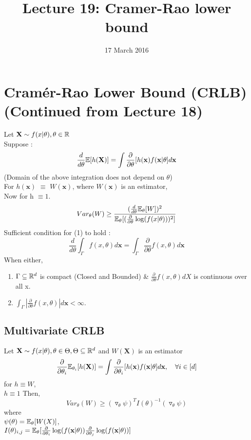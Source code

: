 \documentclass[a4paper,english,12pt]{article}
\title{Lecture 19: Cramer-Rao lower bound}
\date{17 March 2016}
\newcommand{\bx}{\mathbf{x}}
\newcommand{\bX}{\mathbf{X}}
\begin{document}
\author{}
\maketitle
\section{Cram\'{e}r-Rao Lower Bound (CRLB)(Continued from Lecture 18)}
Let $\bX \sim f(x|\theta), \theta \in \R$ \\
Suppose :\\
\begin{equation}
	\frac{d}{d\theta} \E[h(\bX)]=\int \frac{\partial}{\partial\theta} [h(\bx)f(\bx|\theta] d\bx
\end{equation}
(Domain of the above integration does not depend on $\theta$) \\
 For $h(\bx)$ $\equiv$ $W(\bx)$, where   $W(\bx)$  is  an  estimator, \\Now for h $\equiv 1$.\\
 \begin{equation}
 Var_{\theta} (W) \geq \frac{(\frac{d}{d\theta} \mathbb{E}_{\theta}[W])^2}{\mathbb{E}_{\theta}[(\frac{\partial}{\partial\theta} \log (f(x|\theta)))^2]}
 \end{equation}
 Sufficient condition for (1) to hold :
 \begin{equation}
 \frac{d}{d\theta} \int_{\Gamma} f(x,\theta) d\bx = \int_{\Gamma} \frac{\partial}{\partial\theta}  f(x,\theta) d\bx
 \end{equation}
 When either,
 \begin{enumerate}
 	\item $\Gamma \subseteq \mathbb{R}^d $ is compact (Closed and Bounded) \& $\frac{\partial}{\partial\theta}  f(x,\theta) dX$ is continuous over all x. 
 	\item $\int_{\Gamma} |\frac{\partial}{\partial\theta}  f(x,\theta)| d\bx <\infty$.
 \end{enumerate}
\subsection{Multivariate CRLB}
Let $\bX \sim f(x|\theta), \theta \in \Theta, \Theta \subseteq \R^d$ and $W(\bX)$ is an estimator
\begin{equation}
\frac{\partial}{\partial\theta_i} \E_{\theta_i}[h(\bX)]=\int \frac{\partial}{\partial\theta_i} [h(\bx)f(\bx|\theta] d\bx, \quad \forall i \in [d]
\end{equation}
for $h \equiv W$, \\$h \equiv 1$
Then,
\begin{equation}
Var_\theta(W) \geq (\triangledown_\theta\psi)^TI(\theta)^{-1}(\triangledown_\theta\psi)
\end{equation}
where \\
$\psi(\theta) = \mathbb{E}_\theta[W(X)]$, \\
$I(\theta)_{i,j} = \E_\theta[\frac{\partial}{\partial\theta_i} \log(f(\bx|\theta))\frac{\partial}{\partial\theta_j} \log(f(\bx|\theta))]$ \\
\end{document}
